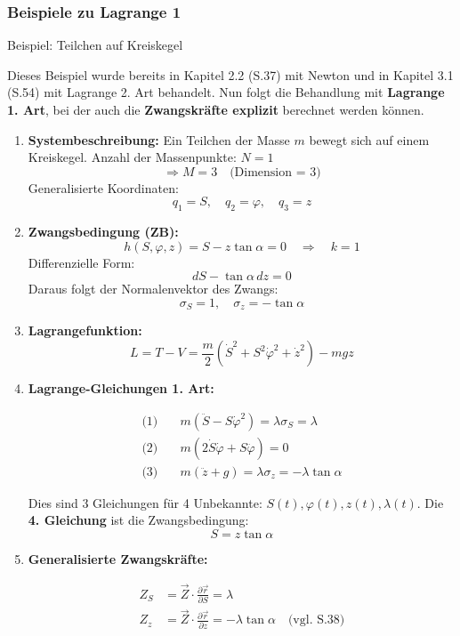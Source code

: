 \documentclass[10pt, letterpaper]{article}
\begin{document}
\subsubsection{Beispiele zu Lagrange 1}

Beispiel: Teilchen auf Kreiskegel


Dieses Beispiel wurde bereits in Kapitel 2.2 (S.37) mit Newton und in Kapitel 3.1 (S.54) mit Lagrange 2. Art behandelt.  
Nun folgt die Behandlung mit \textbf{Lagrange 1. Art}, bei der auch die \textbf{Zwangskräfte explizit} berechnet werden können.

\begin{enumerate}[label=\textbf{\arabic*)}, itemsep=1.5em]

\item \textbf{Systembeschreibung:}  
Ein Teilchen der Masse \( m \) bewegt sich auf einem Kreiskegel.  
Anzahl der Massenpunkte: \( N = 1 \)  
\[
\Rightarrow M = 3 \quad \text{(Dimension = 3)}
\]  
Generalisierte Koordinaten:
\[
q_1 = S, \quad q_2 = \varphi, \quad q_3 = z
\]

\item \textbf{Zwangsbedingung (ZB):}
\[
h(S, \varphi, z) = S - z \tan\alpha = 0 \quad \Rightarrow \quad k = 1
\]
Differenzielle Form:
\[
dS - \tan\alpha \, dz = 0
\]
Daraus folgt der Normalenvektor des Zwangs:
\[
\sigma_S = 1, \quad \sigma_z = -\tan\alpha
\]

\item \textbf{Lagrangefunktion:}
\[
L = T - V = \frac{m}{2} \left( \dot{S}^2 + S^2 \dot{\varphi}^2 + \dot{z}^2 \right) - mgz
\]

\item \textbf{Lagrange-Gleichungen 1. Art:}

\begin{align*}
\text{(1)}\quad & m(\ddot{S} - S \dot{\varphi}^2) = \lambda \sigma_S = \lambda \\[0.5em]
\text{(2)}\quad & m(2 \dot{S} \dot{\varphi} + S \ddot{\varphi}) = 0 \\[0.5em]
\text{(3)}\quad & m(\ddot{z} + g) = \lambda \sigma_z = -\lambda \tan\alpha
\end{align*}

Dies sind 3 Gleichungen für 4 Unbekannte: \( S(t), \varphi(t), z(t), \lambda(t) \).  
Die \textbf{4. Gleichung} ist die Zwangsbedingung:
\[
S = z \tan\alpha
\]

\item \textbf{Generalisierte Zwangskräfte:}

\begin{align*}
Z_S &= \vec{Z} \cdot \frac{\partial \vec{r}}{\partial S} = \lambda \\[0.5em]
Z_z &= \vec{Z} \cdot \frac{\partial \vec{r}}{\partial z} = -\lambda \tan\alpha \quad \text{(vgl. S.38)}
\end{align*}


\end{enumerate}
\end{document}
